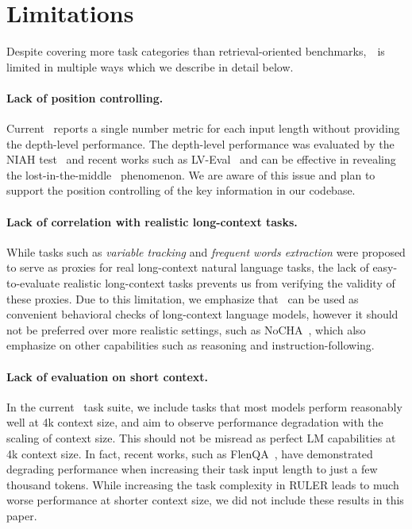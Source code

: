 \section{Limitations}

Despite covering more task categories than retrieval-oriented benchmarks,~\ is limited in multiple ways which we describe in detail below.  

\paragraph{Lack of position controlling.} Current ~reports a single number metric for each input length without providing the depth-level performance. The depth-level performance was evaluated by the NIAH test~\citep{needle} and recent works such as LV-Eval~\citep{lveval} and can be effective in revealing the lost-in-the-middle~\citep{lostmiddle} phenomenon. We are aware of this issue and plan to support the position controlling of the key information in our codebase.

\paragraph{Lack of correlation with realistic long-context tasks.} While tasks such as \emph{variable tracking} and \emph{frequent words extraction} were proposed to serve as proxies for real long-context natural language tasks, the lack of easy-to-evaluate realistic long-context tasks prevents us from verifying the validity of these proxies. Due to this limitation, we emphasize that ~can be used as convenient behavioral checks of long-context language models, however it should not be preferred over more realistic settings, such as NoCHA~\citep{nocha}, which also emphasize on other capabilities such as reasoning and instruction-following.

\paragraph{Lack of evaluation on short context.} In the current ~task suite, we include tasks that most models perform reasonably well at 4k context size, and aim to observe performance degradation with the scaling of context size. This should not be misread as perfect LM capabilities at 4k context size. In fact, recent works, such as FlenQA~\citep{flenQA}, have demonstrated degrading performance when increasing their task input length to just a few thousand tokens. While increasing the task complexity in RULER leads to much worse performance at shorter context size, we did not include these results in this paper.

